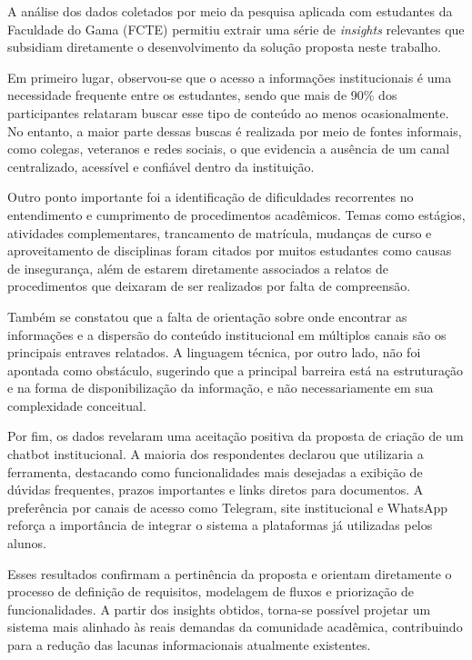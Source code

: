 A análise dos dados coletados por meio da pesquisa aplicada com estudantes da Faculdade do Gama (FCTE) permitiu extrair uma série de \textit{insights} relevantes que subsidiam diretamente o desenvolvimento da solução proposta neste trabalho.

Em primeiro lugar, observou-se que o acesso a informações institucionais é uma necessidade frequente entre os estudantes, sendo que mais de 90\% dos participantes relataram buscar esse tipo de conteúdo ao menos ocasionalmente. No entanto, a maior parte dessas buscas é realizada por meio de fontes informais, como colegas, veteranos e redes sociais, o que evidencia a ausência de um canal centralizado, acessível e confiável dentro da instituição.

Outro ponto importante foi a identificação de dificuldades recorrentes no entendimento e cumprimento de procedimentos acadêmicos. Temas como estágios, atividades complementares, trancamento de matrícula, mudanças de curso e aproveitamento de disciplinas foram citados por muitos estudantes como causas de insegurança, além de estarem diretamente associados a relatos de procedimentos que deixaram de ser realizados por falta de compreensão.

Também se constatou que a falta de orientação sobre onde encontrar as informações e a dispersão do conteúdo institucional em múltiplos canais são os principais entraves relatados. A linguagem técnica, por outro lado, não foi apontada como obstáculo, sugerindo que a principal barreira está na estruturação e na forma de disponibilização da informação, e não necessariamente em sua complexidade conceitual.

Por fim, os dados revelaram uma aceitação positiva da proposta de criação de um chatbot institucional. A maioria dos respondentes declarou que utilizaria a ferramenta, destacando como funcionalidades mais desejadas a exibição de dúvidas frequentes, prazos importantes e links diretos para documentos. A preferência por canais de acesso como Telegram, site institucional e WhatsApp reforça a importância de integrar o sistema a plataformas já utilizadas pelos alunos.

Esses resultados confirmam a pertinência da proposta e orientam diretamente o processo de definição de requisitos, modelagem de fluxos e priorização de funcionalidades. A partir dos insights obtidos, torna-se possível projetar um sistema mais alinhado às reais demandas da comunidade acadêmica, contribuindo para a redução das lacunas informacionais atualmente existentes.

